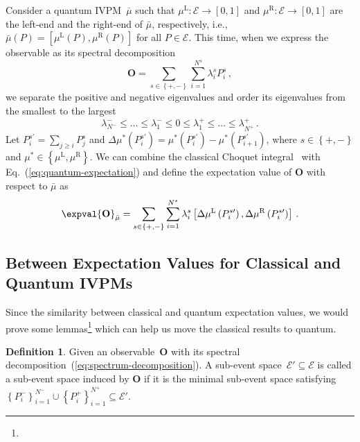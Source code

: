 \documentclass[12pt]{iopart}
\theoremstyle{plain}
\theoremstyle{definition}
\newtheorem{definition}[thm]{Definition}
\theoremstyle{remark}
\newcommand{\events}{\ensuremath{\mathcal{E}}}
\newcommand{\yutsung}[1]{\fbox{\begin{minipage}{0.9\textwidth}\color{purple}{Yu-Tsung says: #1}\end{minipage}}}
\newcommand{\mul}[1][]{\ensuremath{\mu^{\mathrm{L{#1}}}}}
\newcommand{\mur}[1][]{\ensuremath{\mu^{\mathrm{R{#1}}}}}
\begin{document}
Consider a quantum IVPM~$\bar{\mu}$ such that $\mul:\events\rightarrow\left[0,1\right]$
and $\mur:\events\rightarrow\left[0,1\right]$ are the left-end and
the right-end of $\bar{\mu}$, respectively, i.e., $\bar{\mu}\left(P\right)=\left[\mul\left(P\right),\mur\left(P\right)\right]$
for all $P\in\events$. This time, when we express the observable
as its spectral decomposition
\begin{equation}
\mathbf{O}=\sum_{s\in\left\{ +,-\right\} }\sum_{i=1}^{N^{s}}\lambda_{i}^{s}P_{i}^{s}\,,\label{eq:spectrum-decomposition}
\end{equation}
we separate the positive and negative eigenvalues and order its eigenvalues
from the smallest to the largest 
\begin{equation}
\lambda_{N^{-}}^{-}\le\ldots\le\lambda_{1}^{-}\le0\le\lambda_{1}^{+}\le\ldots\le\lambda_{N^{+}}^{+}\,.
\end{equation}
Let $P_{i}^{s\prime}=\sum_{j\ge i}P_{j}^{s}$ and $\Delta\mu^{*}\left(P_{i}^{s\prime}\right)=\mu^{*}\left(P_{i}^{s\prime}\right)-\mu^{*}\left(P_{i+1}^{s\prime}\right)$,
where $s\in\left\{ +,-\right\} $ and $\mu^{*}\in\left\{ \mul,\mur\right\} $.
We can combine the classical Choquet integral~\cite{Vitali1925,Choquet1954,GilboaSchmeidler1994,Grabisch2016}
with Eq.~(\ref{eq:quantum-expectation}) and define the expectation
value of $\mathbf{O}$ with respect to $\bar{\mu}$ as
\begin{equation}
\expval{\mathbf{O}}_{\bar{\mu}}=\sum_{s\in\left\{ +,-\right\} }\sum_{i=1}^{N^{s}}\lambda_{i}^{s}\left[\Delta\mul\left(P_{i}^{s\prime}\right),\Delta\mur\left(P_{i}^{s\prime}\right)\right]\,.\label{eq:quantum-interval-expectation}
\end{equation}

\subsection{Between Expectation Values for Classical and Quantum IVPMs\label{subsec:Between-Expectation-Values-Classical-Quantum}}

Since the similarity between classical and quantum expectation values,
we would prove some lemmas\footnote{\yutsung{functor?}} which can
help us move the classical results to quantum.

\begin{definition}Given an observable~$\mathbf{O}$ with its spectral
decomposition~(\ref{eq:spectrum-decomposition}). A sub-event space~$\events'\subseteq\events$
is called a sub-event space induced by $\mathbf{O}$ if it is the
minimal sub-event space satisfying $\left\{ P_{i}^{-}\right\} _{i=1}^{N^{-}}\cup\left\{ P_{i}^{+}\right\} _{i=1}^{N^{+}}\subseteq\events'$.\end{definition}
\end{document}
